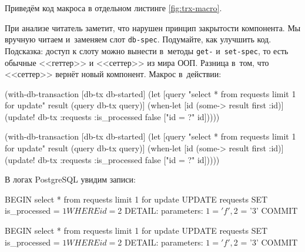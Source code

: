 
Приведём код макроса в отдельном листинге \ref{fig:trx-macro}.

При анализе читатель заметит, что нарушен принцип закрытости компонента. Мы
вручную читаем и~заменяем слот \verb|db-spec|. Подумайте, как улучшить
код. Подсказка: доступ к слоту можно вынести в~методы \verb|get-|
и~\verb|set-spec|, то есть обычные <<геттер>> и <<сеттер>> из мира ООП. Разница
в~том, что <<сеттер>> вернёт новый компонент. Макрос в~действии:

\ifx\DEVICETYPE\MOBILE

\begin{english}
  \begin{clojure}
(with-db-transaction
  [db-tx db-started]
  (let [query "select * from requests
               limit 1 for update"
        result (query db-tx query)]
    (when-let [id (some->
                    result first :id)]
      (update! db-tx :requests
               {:is_processed false}
               ["id = ?" id]))))
  \end{clojure}
\end{english}

\else

\begin{english}
  \begin{clojure}
(with-db-transaction
  [db-tx db-started]
  (let [query "select * from requests limit 1 for update"
        result (query db-tx query)]
    (when-let [id (some-> result first :id)]
      (update! db-tx :requests
               {:is_processed false}
               ["id = ?" id]))))
  \end{clojure}
\end{english}

\fi

\noindent
В логах PostgreSQL увидим записи:


\ifx\DEVICETYPE\MOBILE

\begin{english}
  \begin{sql}
BEGIN
select * from requests
limit 1 for update
UPDATE requests SET is_processed = $1
WHERE id = $2
DETAIL:  parameters: $1 = 'f', $2 = '3'
COMMIT
  \end{sql}
\end{english}

\else

\begin{english}
  \begin{sql}
BEGIN
select * from requests limit 1 for update
UPDATE requests SET is_processed = $1 WHERE id = $2
DETAIL:  parameters: $1 = 'f', $2 = '3'
COMMIT
  \end{sql}
\end{english}

